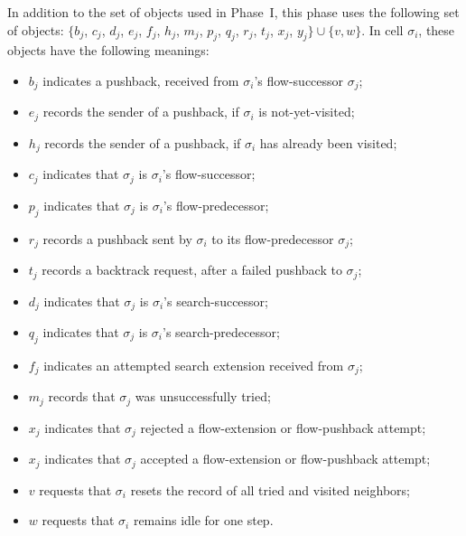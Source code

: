 \documentclass[preliminary,copyright,creativecommons]{eptcs}
\theoremstyle{remark}
\begin{document}
In addition to the set of objects used in Phase~I,
this phase uses the following set of objects:
$\{ b_j$, $c_j$, $d_j$, $e_j$, $f_j$, $h_j$, $m_j$, 
$p_j$, $q_j$, $r_j$, $t_j$, $x_j$, $y_j \} \cup \{ v, w \}$.
In cell $\sigma_i$, these objects have the following meanings:
\begin{itemize}
\item $b_j$ indicates a pushback, received from $\sigma_i$'s flow-successor $\sigma_j$;

\item $e_j$ records the sender of a pushback, if $\sigma_i$ is not-yet-visited;

\item $h_j$ records the sender of a pushback, if $\sigma_i$ has already been visited;

\item $c_j$ indicates that $\sigma_j$ is $\sigma_i$'s flow-successor;

\item $p_j$ indicates that $\sigma_j$ is $\sigma_i$'s flow-predecessor;

\item $r_j$ records a pushback sent by $\sigma_i$ to its flow-predecessor $\sigma_j$;

\item $t_j$ records a backtrack request, after a failed pushback to $\sigma_j$;

\item $d_j$ indicates that $\sigma_j$ is $\sigma_i$'s search-successor;

\item $q_j$ indicates that $\sigma_j$ is $\sigma_i$'s search-predecessor;

\item $f_j$ indicates an attempted search extension received from $\sigma_j$;

\item $m_j$ records that $\sigma_j$ was unsuccessfully tried;

\item $x_j$ indicates that $\sigma_j$ rejected a flow-extension or flow-pushback attempt;

\item $x_j$ indicates that $\sigma_j$ accepted a flow-extension or flow-pushback attempt;

\item $v$ requests that $\sigma_i$ resets the record of all tried and visited neighbors;

\item $w$ requests that $\sigma_i$ remains idle for one step.
\end{itemize}
\end{document}
